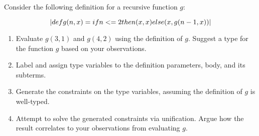 

\pagebreak
\begin{exercise}{}

  Consider the following definition for a recursive function \(g\):

  \begin{equation*}
    \lstinline|def g(n, x)  = if n <=  2 then (x, x)  else (x, g(n - 1, x))|
  \end{equation*}

  \begin{enumerate}
    \item Evaluate \(g(3, 1)\) and \(g(4, 2)\) using the definition of \(g\).
      Suggest a type for the function \(g\) based on your observations.
    \item Label and assign type variables to the definition parameters, body,
      and its subterms.
    \item Generate the constraints on the type variables, assuming the
      definition of \(g\) is well-typed.
    \item Attempt to solve the generated constraints via unification. Argue how
    the result correlates to your observations from evaluating \(g\).
  \end{enumerate}
  

\end{exercise}
